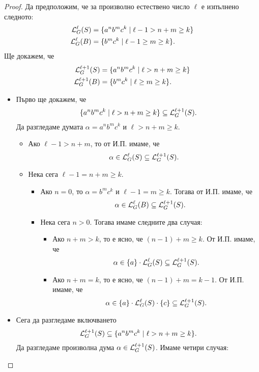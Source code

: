 \begin{proof}
  Да предположим, че за произволно естествено число $\ell$ е изпълнено следното:
  \begin{align*}
    \mathcal{L}^\ell_G(S) & = \{a^nb^mc^k \mid \ell - 1 > n+m \geq k\}\\
    \mathcal{L}^\ell_G(B)  & = \{ b^mc^k \mid \ell -1 \geq m \geq k\}.
  \end{align*}
  Ще докажем, че
  \begin{align*}
    \mathcal{L}^{\ell+1}_G(S) & = \{a^nb^mc^k \mid \ell > n+m \geq k\}\\
    \mathcal{L}^{\ell+1}_G(B)  & = \{ b^mc^k \mid \ell \geq m \geq k\}.
  \end{align*}

  \begin{itemize}
  \item
    Първо ще докажем, че
    \[\{a^nb^mc^k \mid \ell > n+m \geq k\} \subseteq \mathcal{L}^{\ell+1}_G(S).\]
    Да разгледаме думата $\alpha = a^nb^mc^k$ и $\ell > n+m \geq k$.
    \begin{itemize}
    \item
      Ако $\ell - 1 > n+m$, то от И.П. имаме, че
      \[\alpha \in \mathcal{L}^{\ell}_G(S) \subseteq \mathcal{L}^{\ell+1}_G(S).\]
    \item
      Нека сега $\ell-1 = n+m \geq k$.
      \begin{itemize}
      \item
        Ако $n = 0$, то $\alpha = b^mc^k$ и $\ell-1 = m \geq k$. Тогава от И.П. имаме, че
        \[\alpha \in \mathcal{L}^{\ell}_G(B) \subseteq \mathcal{L}^{\ell+1}_G(S).\]
      \item
        Нека сега $n > 0$. Тогава имаме следните два случая:
        \begin{itemize}
        \item 
          Ако $n + m > k$, то е ясно, че $(n-1) + m \geq k$. От И.П. имаме, че
          \[\alpha \in \{a\} \cdot \mathcal{L}^\ell_G(S) \subseteq \mathcal{L}^{\ell+1}_G(S).\]
        \item
          Ако $n + m = k$, то е ясно, че $(n-1) + m = k-1$. От И.П. имаме, че
          \[\alpha \in \{a\} \cdot \mathcal{L}^\ell_G(S) \cdot \{c\} \subseteq \mathcal{L}^{\ell+1}_G(S).\]
        \end{itemize}
      \end{itemize}
    \end{itemize}
  \item
    Сега да разгледаме включването
    \[\mathcal{L}^{\ell+1}_G(S) \subseteq \{a^nb^mc^k \mid \ell > n+m \geq k\}.\]
    Да разгледаме произволна дума $\alpha \in \mathcal{L}^{\ell+1}_G(S)$. Имаме четири случая:

\end{itemize}
\end{proof}
